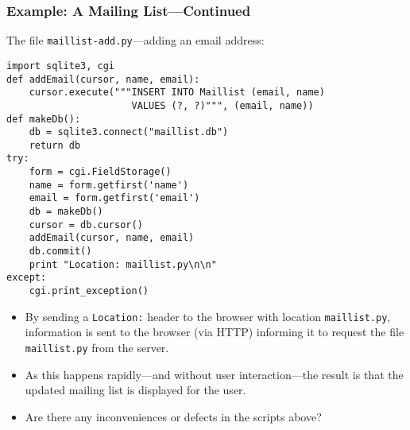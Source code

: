 \documentclass[dvipsnames]{beamer}
\begin{document}
\begin{frame}[fragile=singleslide]
\frametitle{Example: A Mailing List---Continued}

The file \texttt{maillist-add.py}---adding an email address:
\begin{small}
\begin{verbatim}
import sqlite3, cgi
def addEmail(cursor, name, email):
    cursor.execute("""INSERT INTO Maillist (email, name) 
                      VALUES (?, ?)""", (email, name))
def makeDb():
    db = sqlite3.connect("maillist.db")
    return db
try:
    form = cgi.FieldStorage()
    name = form.getfirst('name')   
    email = form.getfirst('email')
    db = makeDb()
    cursor = db.cursor()
    addEmail(cursor, name, email)
    db.commit()
    print "Location: maillist.py\n\n"
except: 
    cgi.print_exception()
\end{verbatim}
\end{small}

\begin{itemize}
\item By sending a \texttt{Location:} header to the browser with location
  \texttt{maillist.py}, information is sent to the browser (via HTTP)
  informing it to request the file \texttt{maillist.py} from the server.
\item As this happens rapidly---and without user interaction---the
  result is that the updated mailing list is displayed for the user.
\item Are there any inconveniences or defects in the scripts above?
\end{itemize}

\end{frame}


\end{document}
